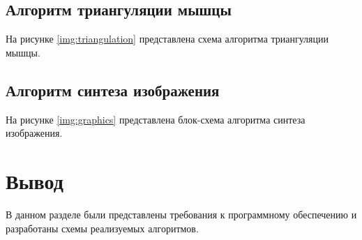 
\clearpage
\subsection{Алгоритм триангуляции мышцы}


На рисунке \ref{img:triangulation} представлена схема алгоритма триангуляции мышцы.


\clearpage
\subsection{Алгоритм синтеза изображения}

На рисунке \ref{img:graphics} представлена блок-схема алгоритма синтеза изображения.


\section*{Вывод}

В данном разделе были представлены требования к программному обеспечению и разработаны схемы реализуемых алгоритмов.
